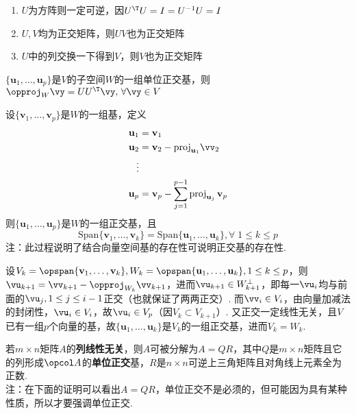\begin{proposition}
\begin{enumerate}
	\itemsep -3pt
	\item $U$为方阵则一定可逆，因$U^\T U=I=U^{-1}U=I$
	\item $U,V$均为正交矩阵，则$UV$也为正交矩阵
	\item $U$中的列交换一下得到$V$，则$V$也为正交矩阵
\end{enumerate}
\end{proposition}
\begin{proposition}
$\{\mathbf{u}_1,\dots,\mathbf{u}_p\}$是$V$的子空间$W$的一组单位正交基，则$\opproj_{W}\vy=UU^\T \vy,\,\forall\vy\in V$
\end{proposition}
\begin{myalgorithm}
\label{schmidt}
设$\{\mathbf{v}_1,\dots,\mathbf{v}_p\}$是$W$的一组基，定义
\[\begin{aligned}\mathbf {u} _{1}&=\mathbf {v} _{1}\\
\mathbf {u} _{2}&=\mathbf {v} _{2}-\mathrm {proj} _{\mathbf {u} _{1}}\vv_2\\
\vdots\\
\mathbf {u} _{p}&=\mathbf {v} _{p}-\sum _{j=1}^{p-1}\mathrm {proj} _{\mathbf {u} _{j}}\,\mathbf {v} _{p}\end{aligned}\]
则$\{\mathbf{u}_1,\dots,\mathbf{u}_p\}$是$W$的一组正交基，且
\[\mathrm{Span}\{\mathbf{v}_1,\dots,\mathbf{v}_k\}=\mathrm{Span}\{\mathbf{u}_1,\dots,\mathbf{u}_k\},\forall\;1\leq k\leq p\]
注：此过程说明了结合向量空间基的存在性可说明正交基的存在性.
\end{myalgorithm}
\begin{analysis}
设$V_k=\opspan\{\mathbf{v}_1,\dots,\mathbf{v}_k\},W_k=\opspan\{\mathbf{u}_1,\dots,\mathbf{u}_k\},1\leq k\leq p$，则$\vu_{k+1}=\vv_{k+1}-\opproj_{W_k}\vv_{k+1}$，进而$\vu_{k+1}\in W_{k+1}^\perp$，即每一$\vu_i$均与前面的$\vu_j,1\leq j\leq i-1$正交（也就保证了两两正交）. 而$\vv_i\in V_i$，由向量加减法的封闭性，$\vu_i\in V_i$，故$\vu_i\in V_p$（因$V_k\subset V_{k+1}$）. 又正交一定线性无关，且$V$已有一组$p$个向量的基，故$\{\mathbf{u}_1,\dots,\mathbf{u}_k\}$是$V_k$的一组正交基，进而$V_k=W_k$.\\
\end{analysis}
\begin{theorem}[QR分解]
\label{qr_fact}
若$m\times n$矩阵$A$的\textbf{列线性无关}，则$A$可被分解为$A=QR$，其中$Q$是$m\times n$矩阵且它的列形成$\opcol A$的\textbf{单位正交}基，$R$是$n\times n$可逆上三角矩阵且对角线上元素全为正数.\\
注：在下面的证明可以看出$A=QR$，单位正交不是必须的，但可能因为具有某种性质，所以才要强调单位正交.
\end{theorem}
